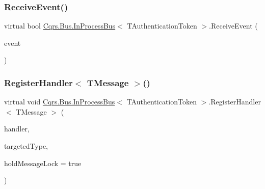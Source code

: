 \mbox{\label{classCqrs_1_1Bus_1_1InProcessBus_aab52f8518371f5ff5e3f193b1234f192}} 
\subsubsection{\texorpdfstring{Receive\+Event()}{ReceiveEvent()}}
{\footnotesize\ttfamily virtual bool \hyperlink{classCqrs_1_1Bus_1_1InProcessBus}{Cqrs.\+Bus.\+In\+Process\+Bus}$<$ T\+Authentication\+Token $>$.Receive\+Event (\begin{DoxyParamCaption}\item[{\hyperlink{interfaceCqrs_1_1Events_1_1IEvent}{I\+Event}$<$ T\+Authentication\+Token $>$ @}]{event }\end{DoxyParamCaption})\hspace{0.3cm}{\ttfamily [virtual]}}

\mbox{\label{classCqrs_1_1Bus_1_1InProcessBus_aa14a00defdf2d48b2d0e6a65dbdb12d9}} 
\subsubsection{\texorpdfstring{Register\+Handler$<$ T\+Message $>$()}{RegisterHandler< TMessage >()}\hspace{0.1cm}{\footnotesize\ttfamily [1/2]}}
{\footnotesize\ttfamily virtual void \hyperlink{classCqrs_1_1Bus_1_1InProcessBus}{Cqrs.\+Bus.\+In\+Process\+Bus}$<$ T\+Authentication\+Token $>$.Register\+Handler$<$ T\+Message $>$ (\begin{DoxyParamCaption}\item[{Action$<$ T\+Message $>$}]{handler,  }\item[{Type}]{targeted\+Type,  }\item[{bool}]{hold\+Message\+Lock = {\ttfamily true} }\end{DoxyParamCaption})\hspace{0.3cm}{\ttfamily [virtual]}}



